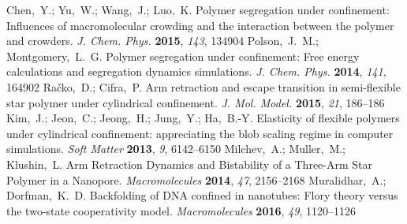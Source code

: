 \documentclass[journal=mamobx,manuscript=article,layout=twocolumn]{achemso}
\begin{document}
\begin{mcitethebibliography}{52}
\EndOfBibitem
{}
Chen,~Y.; Yu,~W.; Wang,~J.; Luo,~K. Polymer segregation under confinement:
  Influences of macromolecular crowding and the interaction between the polymer
  and crowders. \emph{J. Chem. Phys.} \textbf{2015}, \emph{143}, 134904\relax
\mciteBstWouldAddEndPuncttrue
\mciteSetBstMidEndSepPunct{\mcitedefaultmidpunct}
{\mcitedefaultendpunct}{\mcitedefaultseppunct}\relax
\EndOfBibitem
{}
Polson,~J.~M.; Montgomery,~L.~G. Polymer segregation under confinement: Free
  energy calculations and segregation dynamics simulations. \emph{J. Chem.
  Phys.} \textbf{2014}, \emph{141}, 164902\relax
\mciteBstWouldAddEndPuncttrue
\mciteSetBstMidEndSepPunct{\mcitedefaultmidpunct}
{\mcitedefaultendpunct}{\mcitedefaultseppunct}\relax
\EndOfBibitem
{}
Ra{\v{c}}ko,~D.; Cifra,~P. Arm retraction and escape transition in
  semi-flexible star polymer under cylindrical confinement. \emph{J. Mol.
  Model.} \textbf{2015}, \emph{21}, 186--186\relax
\mciteBstWouldAddEndPuncttrue
\mciteSetBstMidEndSepPunct{\mcitedefaultmidpunct}
{\mcitedefaultendpunct}{\mcitedefaultseppunct}\relax
\EndOfBibitem
{}
Kim,~J.; Jeon,~C.; Jeong,~H.; Jung,~Y.; Ha,~B.-Y. Elasticity of flexible
  polymers under cylindrical confinement: appreciating the blob scaling regime
  in computer simulations. \emph{Soft Matter} \textbf{2013}, \emph{9},
  6142--6150\relax
\mciteBstWouldAddEndPuncttrue
\mciteSetBstMidEndSepPunct{\mcitedefaultmidpunct}
{\mcitedefaultendpunct}{\mcitedefaultseppunct}\relax
\EndOfBibitem
{}
Milchev,~A.; Muller,~M.; Klushin,~L. Arm Retraction Dynamics and Bistability of
  a Three-Arm Star Polymer in a Nanopore. \emph{Macromolecules} \textbf{2014},
  \emph{47}, 2156--2168\relax
\mciteBstWouldAddEndPuncttrue
\mciteSetBstMidEndSepPunct{\mcitedefaultmidpunct}
{\mcitedefaultendpunct}{\mcitedefaultseppunct}\relax
\EndOfBibitem
{}
Muralidhar,~A.; Dorfman,~K.~D. Backfolding of DNA confined in nanotubes: Flory
  theory versus the two-state cooperativity model. \emph{Macromolecules}
  \textbf{2016}, \emph{49}, 1120--1126\relax
\mciteBstWouldAddEndPuncttrue
\mciteSetBstMidEndSepPunct{\mcitedefaultmidpunct}
{\mcitedefaultendpunct}{\mcitedefaultseppunct}\relax

\end{mcitethebibliography}
\end{document}
